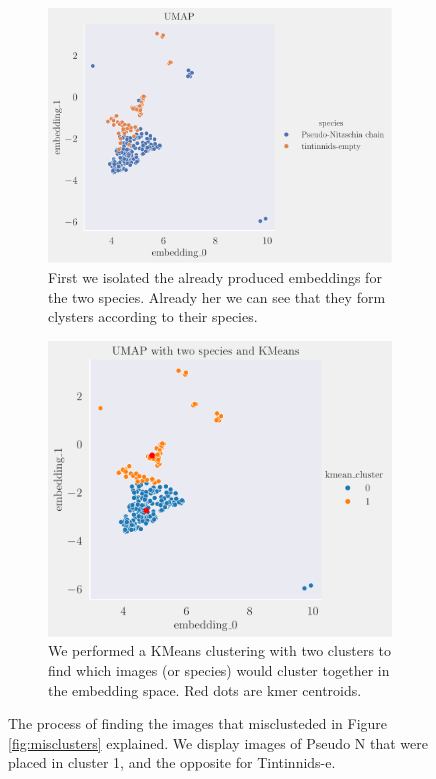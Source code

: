 \begin{figure}[H]
    \centering
    \begin{subfigure}[b]{1\linewidth}
        \includegraphics[width=\linewidth]{examples/tests_eb/figs/umap_on_two_species.pdf}
        \caption{First we isolated the already produced embeddings for the two species. Already her we can see that they form clysters according to their species.}
    \end{subfigure}
    
    \vspace{1em}
    
    \begin{subfigure}[b]{1\linewidth}
        \includegraphics[width=\linewidth]{examples/tests_eb/figs/kmeans_cluster_umap_on_two_species.pdf}
        \caption{We performed a KMeans clustering with two clusters to find which images (or species) would cluster together in the embedding space. Red dots are kmer centroids.}
    \end{subfigure}
    \caption{The process of finding the images that misclusteded in Figure \ref{fig:misclusters} explained. We display images of Pseudo N that were placed in cluster 1, and the opposite for Tintinnids-e.}
    \label{fig:misclustering_process}
\end{figure}
